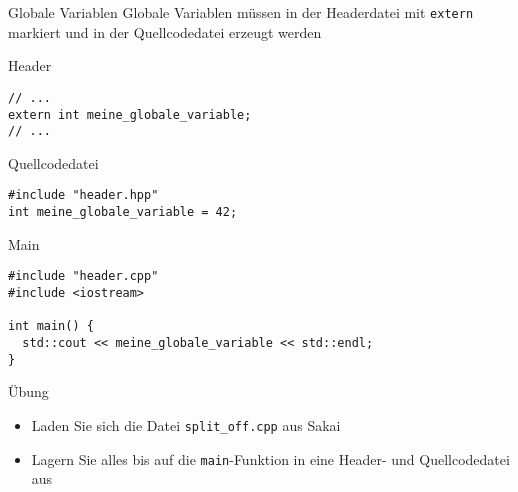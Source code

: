 \documentclass[presentation]{beamer}
\begin{document}
\begin{frame}[label={sec:orgefe31bd},fragile]{Globale Variablen}
 Globale Variablen müssen in der Headerdatei mit {\color{solarizedYellow}\verb!extern!} markiert und
in der Quellcodedatei erzeugt werden
\begin{block}{Header}
\begin{verbatim}
// ...
extern int meine_globale_variable;
// ...
\end{verbatim}
\end{block}
\begin{block}{Quellcodedatei}
\begin{verbatim}
#include "header.hpp"
int meine_globale_variable = 42;
\end{verbatim}
\end{block}
\begin{block}{Main}
\begin{verbatim}
#include "header.cpp"
#include <iostream>

int main() { 
  std::cout << meine_globale_variable << std::endl; 
}
\end{verbatim}
\end{block}
\end{frame}
\begin{frame}[label={sec:orgd109363},fragile]{Übung}
 \begin{itemize}
\item Laden Sie sich die Datei {\color{solarizedYellow}\verb!split_off.cpp!} aus Sakai
\item Lagern Sie alles bis auf die {\color{solarizedYellow}\verb!main!}-Funktion in eine Header- und
Quellcodedatei aus
\end{itemize}
\end{frame}
\end{document}
